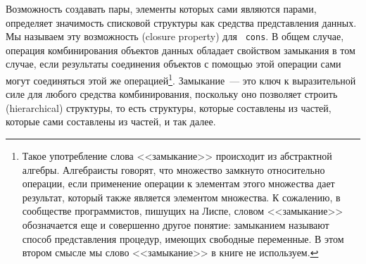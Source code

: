 Возможность создавать пары, элементы которых сами являются
парами, определяет значимость списковой структуры как средства
представления данных.  Мы называем эту возможность  
 (closure property) для {\tt
  cons}. 
В общем случае, операция комбинирования объектов
данных обладает свойством замыкания в том случае, если результаты
соединения объектов с помощью этой операции сами могут соединяться этой 
же операцией\footnote{Такое употребление слова  
<<замыкание>> происходит из
абстрактной алгебры. Алгебраисты говорят, что множество замкнуто относительно
операции, если применение операции к элементам этого множества дает
результат, который также является элементом множества.  К сожалению, в 
сообществе программистов, пишущих на Лиспе, словом <<замыкание>>
обозначается еще и 
совершенно другое понятие: замыканием называют способ представления 
процедур, имеющих свободные переменные.  В этом втором смысле мы слово 
<<замыкание>> в книге не используем.
}.
Замыкание~--- это ключ к выразительной силе для любого средства
комбинирования, поскольку оно позволяет строить  
 (hierarchical) структуры, то 
есть структуры, которые составлены из частей, которые сами составлены
из частей, и так далее.

